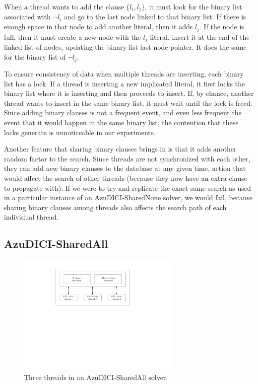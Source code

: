 \documentclass[12pt]{diicc}
\begin{document}
When a thread wants to add the clause $\{l_i,l_j\}$, it must look for 
the binary list associated with $\neg l_i$ and go to the last node linked 
to that binary list. If there is enough space in that node to add 
another literal, then it adds $l_j$. If the node is full, then it must 
create a new node with the $l_j$ literal, insert it at the end of the 
linked list of nodes, 
updating the binary list last node pointer. It does the same for the 
binary list of $\neg l_j$.

To ensure consistency of 
data when multiple threads are inserting, each binary list has a lock. 
If a thread is inserting a new implicated literal, it first locks the 
binary list where it is inserting and then proceeds to insert. If, by 
chance, another thread wants to insert in the same binary list, it must 
wait until the lock is freed. Since adding binary clauses is not a 
frequent event, and even less frequent the event that it would happen 
in the same binary list, the contention that these locks generate is 
unnoticeable in our experiments.

Another feature that sharing binary clauses brings in is that it adds another random factor to the search. Since threads are not synchronized with each other, they can add new binary clauses to the database at any given time, action that would affect the search of other threads (because they now have an extra clause to propagate with). If we were to try and replicate the exact same search as used in a particular instance of an AzuDICI-SharedNone solver, we would fail, because sharing binary clauses among threads also affects the search path of each individual thread.

\subsection{AzuDICI-SharedAll}

\begin{figure}[h!]
	\centering
		\includegraphics[width=0.7\textwidth]{sharedall}
	\caption{Three threads in an AzuDICI-SharedAll solver.}
	\label{fig:azu sharedall}
\end{figure}
\end{document}

